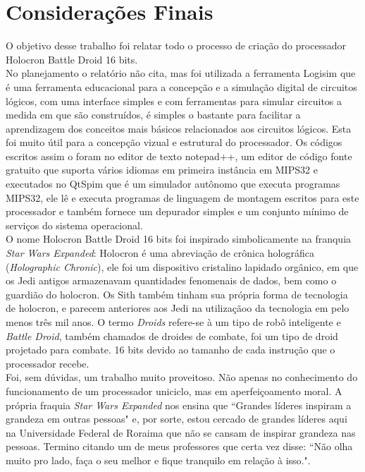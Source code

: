 \documentclass{article}
\newcommand\tab[1][0.50cm]{\hspace*{#1}}
\begin{document}
	\section{Considera\c{c}\~{o}es Finais}
		\tab O objetivo desse trabalho foi relatar todo o processo de cria\c{c}\~{a}o do processador Holocron Battle Droid 16 bits.\\
		\tab No planejamento o relat\'orio n\~ao cita, mas foi utilizada a ferramenta Logisim que \'e uma ferramenta educacional para a concep\c{c}\~{a}o e a simula\c{c}\~{a}o digital de circuitos l\'ogicos, com uma interface simples e com ferramentas para simular circuitos a medida em que s\~ao constru\'idos, \'e simples o bastante para facilitar a aprendizagem dos conceitos mais b\'asicos relacionados aos circuitos l\'ogicos. Esta foi muito \'util para a concep\c{c}\~{a}o vizual e estrutural do processador. Os c\'odigos escritos assim o foram no editor de texto notepad++, um editor de c\'odigo fonte gratuito que suporta v\'arios idiomas em primeira inst\^ancia em MIPS32 e executados no QtSpim que \'e um simulador aut\^onomo que executa programas MIPS32, ele l\^e e executa programas de linguagem de montagem escritos para este processador e tamb\'em fornece um depurador simples e um conjunto m\'inimo de servi\c{c}os do sistema operacional.\\
		\tab O nome Holocron Battle Droid 16 bits foi inspirado simbolicamente na franquia \textit{Star Wars Expanded}: Holocron \'e uma abrevia\c{c}\~{a}o de cr\^onica hologr\'afica (\textit{Holographic Chronic}), ele foi um dispositivo cristalino lapidado org\^anico, em que os Jedi antigos armazenavam quantidades fenomenais de dados, bem como o guardi\~ao do holocron. Os Sith tamb\'em tinham sua pr\'opria forma de tecnologia de holocron, e parecem anteriores aos Jedi na utiliza\c{c}\~{a}oo da tecnologia em pelo menos tr\^es mil anos. O termo \textit{Droids} refere-se \`a um tipo de rob\^o inteligente e \textit{Battle Droid}, tamb\'em chamados de droides de combate, foi um tipo de droid projetado para combate. 16 bits devido ao tamanho de cada instru\c{c}\~{a}o que o processador recebe.\\		
		\tab Foi, sem d\'uvidas, um trabalho muito proveitoso. N\~ao apenas no conhecimento do funcionamento de um processador uniciclo, mas em aperfei\c{c}oamento moral. A pr\'opria fraquia \textit{Star Wars Expanded} nos ensina que ``Grandes l\'ideres inspiram a grandeza em outras pessoas" e, por sorte, estou cercado de grandes l\'ideres aqui na Universidade Federal de Roraima que n\~ao se cansam de inspirar grandeza nas pessoas. Termino citando um de meus professores que certa vez disse: ``N\~ao olha muito pro lado, fa\c{c}a o seu melhor e fique tranquilo em rela\c{c}\~{a}o \`a isso.".
\end{document}
